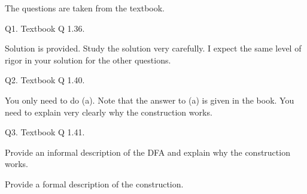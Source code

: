 



\renewcommand\TITLE{Assignment 18}
\renewcommand\AUTHOR{John Doe}
\renewcommand\EMAIL{jdoe@jdoe.com}


\topmatter


The questions are taken from the textbook.


Q1. Textbook Q 1.36.

Solution is provided. Study the solution very carefully.
I expect the same level of rigor in your solution for the other questions.


\SOLUTION






\newpage
Q2. Textbook Q 1.40.

You only need to do (a).
Note that the answer to (a) is given in the book.
You need to explain very clearly why the construction works.
 

\SOLUTION






\newpage
Q3. Textbook Q 1.41.

Provide an informal description of the DFA and explain why the construction
works.

Provide a formal description of the construction.

\SOLUTION







